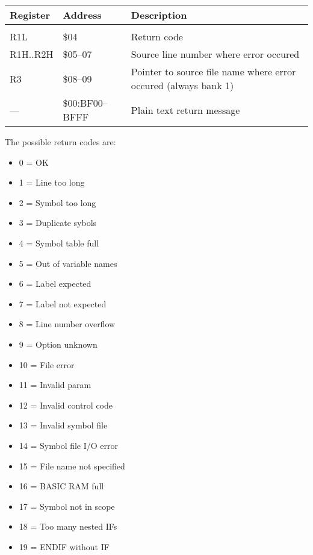 \documentclass{article}
\begin{document}
        \begin{longtable}[l]{l l p{6cm}}
            \textbf{Register} & \textbf{Address} & \textbf{Description} \\
	        \hline \\
            R1L      & \$04       & Return code \\
            R1H..R2H & \$05--07   & Source line number where error occured \\
            R3       & \$08--09   & Pointer to source file name where error occured (always bank 1) \\
            ---      & \$00:BF00--BFFF & Plain text return message \\
        \end{longtable}

        The possible return codes are:

        \begin{itemize}
            \item 0 = OK
            \item 1 = Line too long
            \item 2 = Symbol too long
            \item 3 = Duplicate sybols
            \item 4 = Symbol table full
            \item 5 = Out of variable names
            \item 6 = Label expected
            \item 7 = Label not expected
            \item 8 = Line number overflow
            \item 9 = Option unknown
            \item 10 = File error
            \item 11 = Invalid param
            \item 12 = Invalid control code
            \item 13 = Invalid symbol file
            \item 14 = Symbol file I/O error
            \item 15 = File name not specified
            \item 16 = BASIC RAM full
            \item 17 = Symbol not in scope
            \item 18 = Too many nested IFs
            \item 19 = ENDIF without IF
        \end{itemize}
\end{document}
